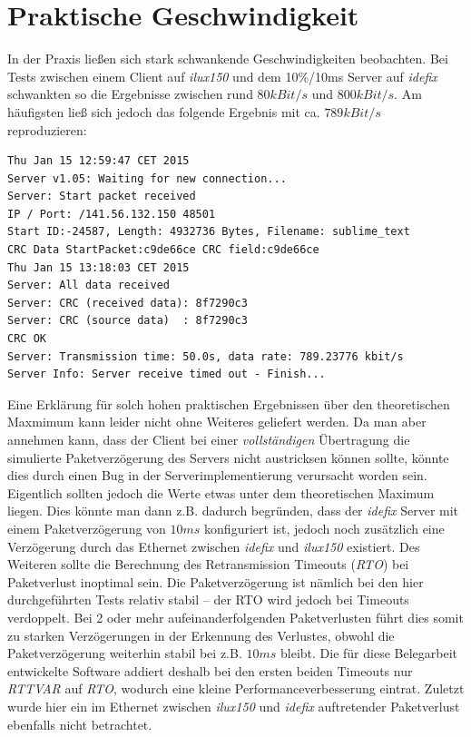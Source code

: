 \newpage

\section{Praktische Geschwindigkeit}

In der Praxis ließen sich stark schwankende Geschwindigkeiten beobachten.
Bei Tests zwischen einem Client auf \textit{ilux150} und dem 10\%/10ms Server auf \textit{idefix} schwankten so die Ergebnisse zwischen rund \(80kBit/s\) und \(800kBit/s\).
Am häufigsten ließ sich jedoch das folgende Ergebnis mit ca. \(789kBit/s\) reproduzieren:

{
\scriptsize
\begin{verbatim}
Thu Jan 15 12:59:47 CET 2015
Server v1.05: Waiting for new connection...
Server: Start packet received
IP / Port: /141.56.132.150 48501
Start ID:-24587, Length: 4932736 Bytes, Filename: sublime_text
CRC Data StartPacket:c9de66ce CRC field:c9de66ce
Thu Jan 15 13:18:03 CET 2015
Server: All data received
Server: CRC (received data): 8f7290c3
Server: CRC (source data)  : 8f7290c3
CRC OK
Server: Transmission time: 50.0s, data rate: 789.23776 kbit/s
Server Info: Server receive timed out - Finish...
\end{verbatim}
}

Eine Erklärung für solch hohen praktischen Ergebnissen über den theoretischen Maxmimum kann leider nicht ohne Weiteres geliefert werden.
Da man aber annehmen kann, dass der Client bei einer \textit{vollständigen} Übertragung die simulierte Paketverzögerung des Servers nicht austricksen können sollte, könnte dies durch einen Bug in der Serverimplementierung verursacht worden sein. \\

Eigentlich sollten jedoch die Werte etwas unter dem theoretischen Maximum liegen.
Dies könnte man dann z.B. dadurch begründen, dass der \textit{idefix} Server mit einem Paketverzögerung von \(10ms\) konfiguriert ist, jedoch noch zusätzlich eine Verzögerung durch das Ethernet zwischen \textit{idefix} und \textit{ilux150} existiert.
Des Weiteren sollte die Berechnung des Retransmission Timeouts (\textit{RTO}) bei Paketverlust inoptimal sein.
Die Paketverzögerung ist nämlich bei den hier durchgeführten Tests relativ stabil -- der RTO wird jedoch bei Timeouts verdoppelt.
Bei 2 oder mehr aufeinanderfolgenden Paketverlusten führt dies somit zu starken Verzögerungen in der Erkennung des Verlustes, obwohl die Paketverzögerung weiterhin stabil bei z.B. \(10ms\) bleibt.
Die für diese Belegarbeit entwickelte Software addiert deshalb bei den ersten beiden Timeouts nur \textit{RTTVAR} auf \textit{RTO}, wodurch eine kleine Performanceverbesserung eintrat.
Zuletzt wurde hier ein im Ethernet zwischen \textit{ilux150} und \textit{idefix} auftretender Paketverlust ebenfalls nicht betrachtet.

